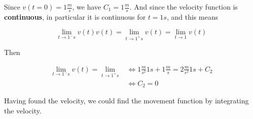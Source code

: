 \documentclass[a4paper, 12pt]{article}
\begin{document}
Since $v(t = 0) = 1 \frac{m}{s}$, we have $C_1 = 1 \frac{m}{s}$.
And since the velocity function is \textbf{continuous}, in particular 
it is continuous for $t = 1 s$, and this means 

\begin{equation*}
    \lim_{t \to 1^- s} v(t) v(t) = \lim_{t \to 1^+ s} v(t) = \lim_{t \to 1} v(t)
\end{equation*}

Then 

\begin{align*}
    \lim_{t \to 1^- s} v(t) = \lim_{t\to 1^+ s} &\iff 1 \frac{m}{s^2} 1 s + 1 \frac{m}{s} = 2 \frac{m}{s^2}1 s + C_2 \\ 
                                                &\iff C_2 = 0
\end{align*}


Having found the velocity, we could find the movement function by integrating the 
velocity.
\end{document}
